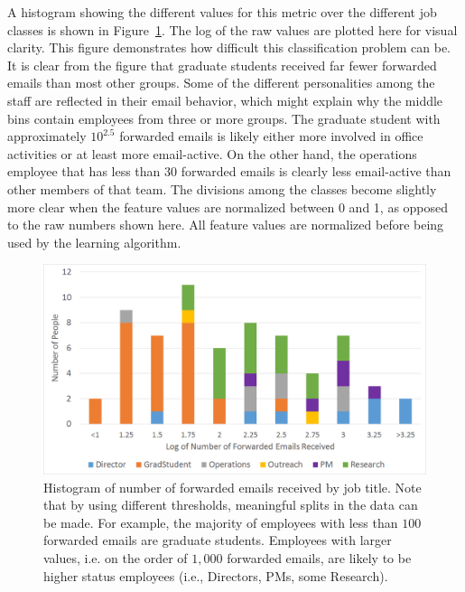 \documentclass[12pt]{report}
\begin{document}
A histogram showing the different values for this metric over the different job classes is shown in Figure~\ref{fig:traffic_ex_hist}.
The log of the raw values are plotted here for visual clarity.
This figure demonstrates how difficult this classification problem can be.
It is clear from the figure that graduate students received far fewer forwarded emails than most other groups.
Some of the different personalities among the staff are reflected in their email behavior, which might explain why the middle bins contain employees from three or more groups.
The graduate student with approximately $10^{2.5}$ forwarded emails is likely either more involved in office activities or at least more email-active.  
On the other hand, the operations employee that has less than $30$ forwarded emails is clearly less email-active than other members of that team.
The divisions among the classes become slightly more clear when the feature values are normalized between 0 and 1, as opposed to the raw numbers shown here.
All feature values are normalized before being used by the learning algorithm.
\begin{figure}[t]
    \centering
        \includegraphics[width=\columnwidth,trim={0mm 0mm 0mm 0mm},clip]{FW_hist}
        \caption[Forwarded emails received histogram]{Histogram of number of forwarded emails received by job title.  Note that by using different thresholds, meaningful splits in the data can be made.  For example, the majority of employees with less than $100$ forwarded emails are graduate students. Employees with larger values, i.e. on the order of $1,000$ forwarded emails, are likely to be higher status employees (i.e., Directors, PMs, some Research).}
        \label{fig:traffic_ex_hist}
\end{figure}
\end{document}
